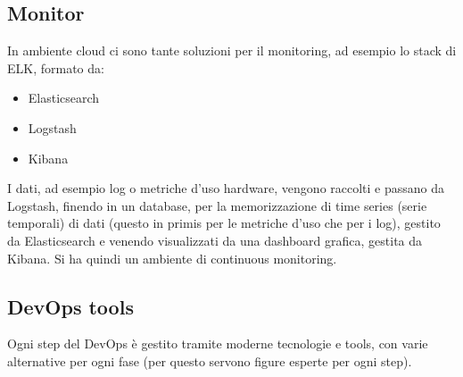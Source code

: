 \subsection{Monitor}
In ambiente cloud ci sono tante soluzioni per il monitoring, ad esempio lo stack
di ELK, formato da:
\begin{itemize}
      \item Elasticsearch
      \item Logstash
      \item Kibana
\end{itemize}
I dati, ad esempio log o metriche d'uso hardware, vengono raccolti e passano da
Logstash, finendo in un database, per la memorizzazione di time series (serie
temporali) di dati (questo in primis per le metriche d'uso che per i log), gestito
da Elasticsearch e venendo visualizzati da una dashboard grafica, gestita da
Kibana. Si ha quindi un ambiente di continuous monitoring.
\subsection{DevOps tools}
Ogni step del DevOps è gestito tramite moderne tecnologie e tools, con varie
alternative per ogni fase (per questo servono figure esperte per ogni step).
